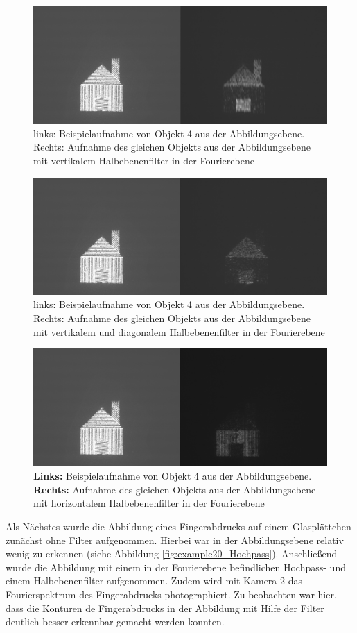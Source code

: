 \begin{figure}
	\centering
	\includegraphics[width=0.7\linewidth]{images/example17.png}
	\caption{links: Beispielaufnahme von Objekt 4 aus der Abbildungsebene. Rechts: Aufnahme des gleichen Objekts aus der Abbildungsebene mit vertikalem Halbebenenfilter in der Fourierebene}
	\label{fig:example17}
\end{figure}

\begin{figure}
	\centering
	\includegraphics[width=0.7\linewidth]{images/example18.png}
	\caption{links: Beispielaufnahme von Objekt 4 aus der Abbildungsebene. Rechts: Aufnahme des gleichen Objekts aus der Abbildungsebene mit vertikalem und diagonalem Halbebenenfilter in der Fourierebene}
	\label{fig:example18}
\end{figure}

\begin{figure}
	\centering
	\includegraphics[width=0.7\linewidth]{images/example19.png}
	\caption{
		\textbf{Links:} Beispielaufnahme von Objekt 4 aus der Abbildungsebene. \textbf{Rechts:} Aufnahme des gleichen Objekts aus der Abbildungsebene mit horizontalem Halbebenenfilter in der Fourierebene
	}
	\label{fig:example19}
\end{figure}

Als Nächstes wurde die Abbildung eines Fingerabdrucks auf einem Glasplättchen zunächst ohne Filter aufgenommen. Hierbei war in der Abbildungsebene relativ wenig zu erkennen (siehe Abbildung \ref{fig:example20_Hochpass}). Anschließend wurde die Abbildung mit einem in der Fourierebene befindlichen Hochpass- und einem Halbebenenfilter aufgenommen. Zudem wird mit Kamera 2 das Fourierspektrum des Fingerabdrucks photographiert. Zu beobachten war hier, dass die Konturen de Fingerabdrucks in der Abbildung mit Hilfe der Filter deutlich besser erkennbar gemacht werden konnten.\\

